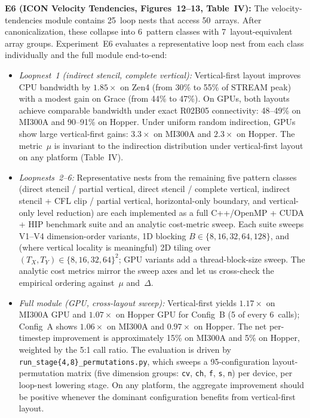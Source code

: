 \documentclass[conference]{IEEEtran}
\begin{document}
\textbf{E6 (ICON Velocity Tendencies, Figures~12--13, Table~IV):}
The velocity-tendencies module contains 25~loop nests that access 50~arrays.
After canonicalization, these collapse into 6~pattern classes with 7~layout-equivalent array groups.
Experiment~E6 evaluates a representative loop nest from each class individually and the full module end-to-end:
\begin{itemize}
\item \emph{Loopnest~1 (indirect stencil, complete vertical):} Vertical-first layout improves CPU bandwidth by $1.85\times$ on Zen4 (from 30\% to 55\% of STREAM peak) with a modest gain on Grace (from 44\% to 47\%).
On GPUs, both layouts achieve comparable bandwidth under exact R02B05 connectivity: 48--49\% on MI300A and 90--91\% on Hopper.
Under uniform random indirection, GPUs show large vertical-first gains: $3.3\times$ on MI300A and $2.3\times$ on Hopper.
The metric~$\mu$ is invariant to the indirection distribution under vertical-first layout on any platform (Table~IV).
\item \emph{Loopnests~2--6:} Representative nests from the remaining five pattern classes (direct stencil / partial vertical, direct stencil / complete vertical, indirect stencil + CFL clip / partial vertical, horizontal-only boundary, and vertical-only level reduction) are each implemented as a full C++/OpenMP + CUDA + HIP benchmark suite and an analytic cost-metric sweep.
Each suite sweeps V1--V4 dimension-order variants, 1D blocking $B \in \{8,16,32,64,128\}$, and (where vertical locality is meaningful) 2D tiling over $(T_X, T_Y) \in \{8,16,32,64\}^2$; GPU variants add a thread-block-size sweep.
The analytic cost metrics mirror the sweep axes and let us cross-check the empirical ordering against~$\mu$ and~$\Delta$.
\item \emph{Full module (GPU, cross-layout sweep):} Vertical-first yields $1.17\times$ on MI300A GPU and $1.07\times$ on Hopper GPU for Config~B (5 of every 6~calls); Config~A shows $1.06\times$ on MI300A and $0.97\times$ on Hopper.
The net per-timestep improvement is approximately 15\% on MI300A and 5\% on Hopper, weighted by the 5:1 call ratio.
The evaluation is driven by \texttt{run\_stage\{4,8\}\_permutations.py}, which sweeps a 95-configuration layout-permutation matrix (five dimension groups: \texttt{cv}, \texttt{ch}, \texttt{f}, \texttt{s}, \texttt{n}) per device, per loop-nest lowering stage.
On any platform, the aggregate improvement should be positive whenever the dominant configuration benefits from vertical-first layout.
\end{itemize}
\end{document}
